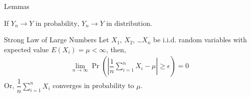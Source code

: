 \documentclass{beamer}
\providecommand{\pr}[1]{\ensuremath{\Pr\left(#1\right)}}
\begin{document}
\begin{frame}{Lemmas}
\begin{lemma}\label{lma1}
    If
    \begin{math}
    {Y_n} \to Y \text{ in probability, }{Y_n} \to Y \text{ in distribution.}
    \end{math}
\end{lemma}

\begin{block}{Strong Law of Large Numbers}\label{lma3} 
Let $X_1$, $X_2$, \ldots $X_n$ be i.i.d. random variables with expected value $E(X_i)=\mu < \infty$, then,
\begin{align}
    \lim_{n \to \infty}\pr{\left|\dfrac{1}{n}\sum_{i=1}^n X_i - \mu \right|\geq \epsilon}=0
\end{align}
Or, 
\begin{math}
    \dfrac{1}{n}\sum_{i=1}^n X_i
\end{math}
converges in probability to $\mu$.
\end{block}
\end{frame}
\end{document}
